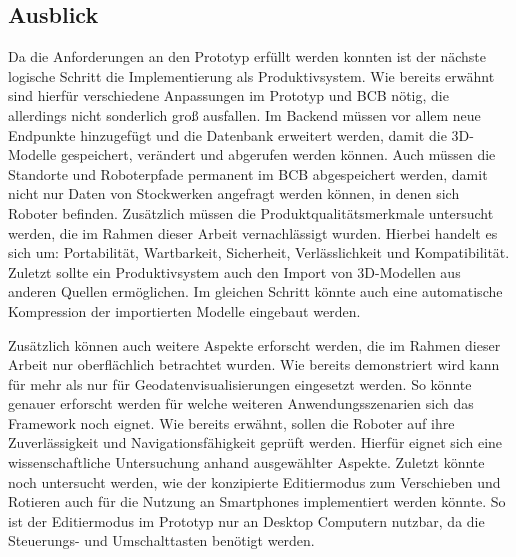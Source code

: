 \subsection{Ausblick}
Da die Anforderungen an den Prototyp erfüllt werden konnten ist der nächste logische Schritt die Implementierung als Produktivsystem. Wie bereits erwähnt sind hierfür verschiedene Anpassungen im Prototyp und \ac{BCB} nötig, die allerdings nicht sonderlich groß ausfallen. Im Backend müssen vor allem neue Endpunkte hinzugefügt und die Datenbank erweitert werden, damit die 3D-Modelle gespeichert, verändert und abgerufen werden können. Auch müssen die Standorte und Roboterpfade permanent im \ac{BCB} abgespeichert werden, damit nicht nur Daten von Stockwerken angefragt werden können, in denen sich Roboter befinden. Zusätzlich müssen die Produktqualitätsmerkmale untersucht werden, die im Rahmen dieser Arbeit vernachlässigt wurden. Hierbei handelt es sich um: Portabilität, Wartbarkeit, Sicherheit, Verlässlichkeit und Kompatibilität. Zuletzt sollte ein Produktivsystem auch den Import von 3D-Modellen aus anderen Quellen ermöglichen. Im gleichen Schritt könnte auch eine automatische Kompression der importierten Modelle eingebaut werden.

Zusätzlich können auch weitere Aspekte erforscht werden, die im Rahmen dieser Arbeit nur oberflächlich betrachtet wurden. Wie bereits demonstriert wird kann \deckgl{} für mehr als nur für Geodatenvisualisierungen eingesetzt werden. So könnte genauer erforscht werden für welche weiteren Anwendungsszenarien sich das Framework noch eignet. Wie bereits erwähnt, sollen die Roboter auf ihre Zuverlässigkeit und Navigationsfähigkeit geprüft werden. Hierfür eignet sich eine wissenschaftliche Untersuchung anhand ausgewählter Aspekte. Zuletzt könnte noch untersucht werden, wie der konzipierte Editiermodus zum Verschieben und Rotieren auch für die Nutzung an Smartphones implementiert werden könnte. So ist der Editiermodus im Prototyp nur an Desktop Computern nutzbar, da die Steuerungs- und Umschalttasten benötigt werden.


